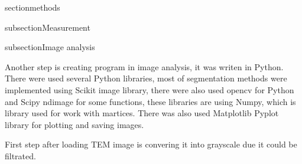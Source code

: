 section{methods}

\pagestyle{plain}

subsection{Measurement}

subsection{Image analysis}

Another step is creating program in image analysis, it was writen in Python.
There were used several Python libraries, most of segmentation methods were
implemented using Scikit image library, there were also used opencv for Python
and Scipy ndimage for some functions, these libraries are using Numpy, which
is library used for work with martices. There was also used Matplotlib Pyplot
library for plotting and saving images.

First step after loading TEM image is convering it into grayscale due it could
be filtrated. 
